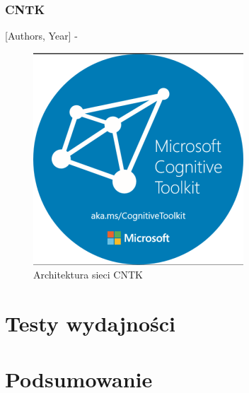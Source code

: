 \documentclass[a4paper,twoside,titlepage,openright]{book}
\begin{document}
\subsection{CNTK}
[Authors, Year] - 
\begin{figure}[h]
	\centering
			\includegraphics[resolution=120]{CNTK.png}
		\caption{Architektura sieci CNTK}
\end{figure}

\chapter{Testy wydajności}


\chapter{Podsumowanie} 

\listoffigures

\end{document}
